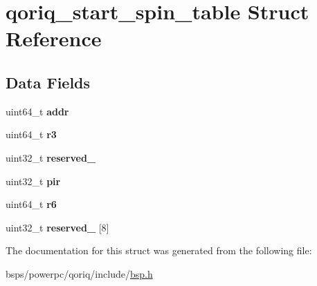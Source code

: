 \hypertarget{structqoriq__start__spin__table}{}\section{qoriq\+\_\+start\+\_\+spin\+\_\+table Struct Reference}
\label{structqoriq__start__spin__table}
\subsection*{Data Fields}
\begin{DoxyCompactItemize}
\item 
\mbox{\label{structqoriq__start__spin__table_ac5bf6bcd5ab2ff2e0c67077fd8538a69}} 
uint64\+\_\+t {\bfseries addr}
\item 
\mbox{\label{structqoriq__start__spin__table_a645572bfea42b9f75b9fd2096f9b807a}} 
uint64\+\_\+t {\bfseries r3}
\item 
\mbox{\label{structqoriq__start__spin__table_a5431d064ecc45c7ee6c4ed6fe5b16c88}} 
uint32\+\_\+t {\bfseries reserved\+\_}
\item 
\mbox{\label{structqoriq__start__spin__table_a90f4db9291fc44dacd7357485244000c}} 
uint32\+\_\+t {\bfseries pir}
\item 
\mbox{\label{structqoriq__start__spin__table_a27b1e12090d178d84f51e682d1715b8a}} 
uint64\+\_\+t {\bfseries r6}
\item 
\mbox{\label{structqoriq__start__spin__table_a03eaa113fbed0b65afa8caf1de75303c}} 
uint32\+\_\+t {\bfseries reserved\+\_} \mbox{[}8\mbox{]}
\end{DoxyCompactItemize}


The documentation for this struct was generated from the following file\+:\begin{DoxyCompactItemize}
\item 
bsps/powerpc/qoriq/include/\mbox{\hyperlink{bsps_2powerpc_2qoriq_2include_2bsp_8h}{bsp.\+h}}\end{DoxyCompactItemize}
